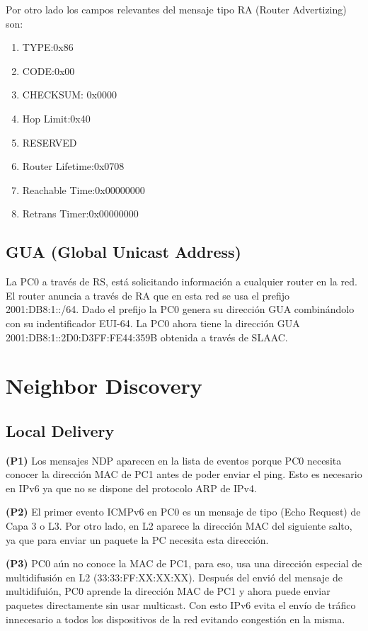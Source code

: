 \documentclass[12pt]{article}
\begin{document}
Por otro lado los campos relevantes del mensaje tipo RA (Router Advertizing) son:

\begin{enumerate}
	\item TYPE:0x86
	
	\item CODE:0x00
	
	\item CHECKSUM: 0x0000
	
	\item Hop Limit:0x40
	
	\item RESERVED
	
	\item Router Lifetime:0x0708 
	
	\item Reachable Time:0x00000000
	
	\item Retrans Timer:0x00000000
\end{enumerate}

\subsection{GUA (Global Unicast Address)}
La PC0 a través de RS, está solicitando información a cualquier router en la red. El router anuncia a través de RA que en esta red se usa el prefijo 2001:DB8:1::/64. Dado el prefijo la PC0 genera su dirección GUA combinándolo con su indentificador EUI-64. La PC0 ahora tiene la dirección GUA 2001:DB8:1::2D0:D3FF:FE44:359B obtenida a través de SLAAC.

\newpage
\section{Neighbor Discovery}
\subsection{Local Delivery}
\textbf{(P1)} Los mensajes NDP aparecen en la lista de eventos porque PC0 necesita conocer la dirección MAC de PC1 antes de poder enviar el ping. Esto es necesario en IPv6 ya que no se dispone del protocolo ARP de IPv4.

\textbf{(P2)} El primer evento ICMPv6 en PC0 es un mensaje de tipo (Echo Request) de Capa 3 o L3. Por otro lado, en L2 aparece la dirección MAC del siguiente salto, ya que para enviar un paquete la PC necesita esta dirección.

\textbf{(P3)} PC0 aún no conoce la MAC de PC1, para eso, usa una dirección especial de multidifusión en L2 (33:33:FF:XX:XX:XX). Después del envió del mensaje de multidifuión, PC0 aprende la dirección MAC de PC1 y ahora puede enviar paquetes directamente sin usar multicast. Con esto IPv6 evita el envío de tráfico innecesario a todos los dispositivos de la red evitando congestión en la misma.
\end{document}
